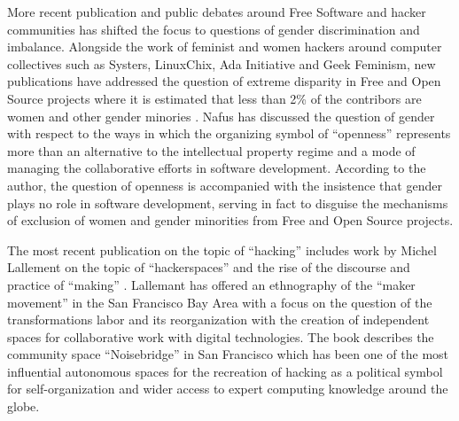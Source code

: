 \documentclass[10pt,letter,oneside]{scrartcl}
\begin{document}
More recent publication and public debates around Free Software and hacker
communities has shifted the focus to questions of gender discrimination and
imbalance.  Alongside the work of feminist and women hackers around computer
collectives such as Systers, LinuxChix, Ada Initiative and Geek Feminism, new
publications have addressed the question of extreme disparity in Free and Open
Source projects where it is estimated that less than 2\% of the contribors are
women and other gender minories \autocite{ghosh_understanding_2005}.  Nafus
\parencite*{nafus_patches_2012} has discussed the question of gender with respect to
the ways in which the organizing symbol of ``openness'' represents more than an
alternative to the intellectual property regime and a mode of managing the
collaborative efforts in software development.  According to the author, the
question of openness is accompanied with the insistence that gender plays no
role in software development, serving in fact to disguise the mechanisms of
exclusion of women and gender minorities from Free and Open Source projects.


The most recent publication on the topic of ``hacking'' includes work by Michel
Lallement on the topic of ``hackerspaces'' and the rise of the discourse and
practice of ``making'' \autocite{lallement2016}.  Lallemant has offered an ethnography
of the ``maker movement'' in the San Francisco Bay Area with a focus on the
question of the transformations labor and its reorganization with the creation
of independent spaces for collaborative work with digital technologies. The book
describes the community space ``Noisebridge'' in San Francisco which has been
one of the most influential autonomous spaces for the recreation of hacking as a
political symbol for self-organization and wider access to expert computing 
knowledge around the globe.
\end{document}
